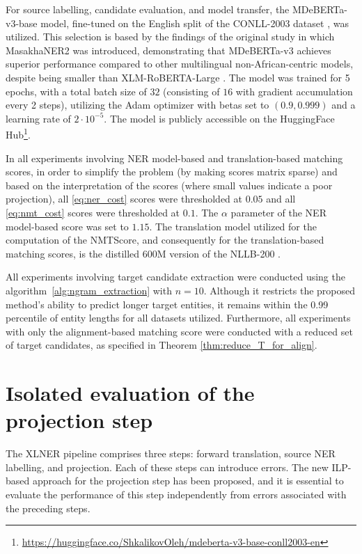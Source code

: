 For source labelling, candidate evaluation, and model transfer, the MDeBERTa-v3-base \cite{He2021DeBERTaV3ID}
model, fine-tuned on the English split of the CONLL-2003 dataset \cite{tjong-kim-sang-de-meulder-2003-introduction-conll},
was utilized. This selection is based by the findings of the original study in which
MasakhaNER2 was introduced, demonstrating that MDeBERTa-v3 achieves superior performance
compared to other multilingual non-African-centric models, despite being smaller than
XLM-RoBERTA-Large \cite{conneau-etal-2020-unsupervised-xlmr}. The model was trained
for 5 epochs, with a total batch size of \( 32 \) (consisting of \( 16 \) with gradient
accumulation every 2 steps), utilizing the Adam optimizer \cite{Kingma2014AdamAM} with
betas set to \( (0.9,0.999) \) and a learning rate of \( 2 \cdot 10^{-5} \). The model
is publicly accessible on the HuggingFace Hub\footnote{\url{https://huggingface.co/ShkalikovOleh/mdeberta-v3-base-conll2003-en}}.

In all experiments involving NER model-based and translation-based matching scores,
in order to simplify the problem (by making scores matrix sparse) and based on the interpretation of the scores
(where small values indicate a poor projection), all \eqref{eq:ner_cost} scores were
thresholded at \( 0.05 \) and all \eqref{eq:nmt_cost} scores were thresholded
at \( 0.1 \). The \( \alpha \) parameter of the NER model-based score was set to \( 1.15 \).
The translation model utilized for the computation of the NMTScore, and consequently
for the translation-based matching scores, is the distilled 600M version of the NLLB-200 \cite{nllbteam2022languageleftbehindscaling}.

All experiments involving target candidate extraction were conducted using the
algorithm~\ref{alg:ngram_extraction} with \( n = 10 \). Although it restricts the proposed method's
ability to predict longer target entities, it remains within the 0.99 percentile of entity lengths
for all datasets utilized. Furthermore, all experiments with only the alignment-based matching
score were conducted with a reduced set of target candidates, as specified in Theorem \ref{thm:reduce_T_for_align}.

\section{Isolated evaluation of the projection step}
The XLNER pipeline comprises three steps: forward translation, source NER labelling,
and projection. Each of these steps can introduce errors. The new ILP-based approach for the
projection step has been proposed, and it is essential to evaluate the performance
of this step independently from errors associated with the preceding steps.

